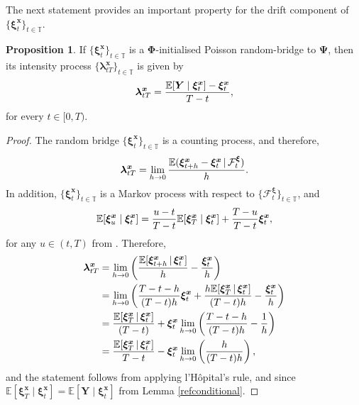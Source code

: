 \documentclass{article}
\def\E{\mathbb{E}}
\def\T{\mathbb{T}}
\def\F{\mathcal{F}}
\def\xib{\boldsymbol{\xi}}
\theoremstyle{definition}
\newtheorem{proposition}{Proposition}[section]
\begin{document}
The next statement provides an important property for the drift component of $\{\boldsymbol{\xi}^{\boldsymbol{x}}_t\}_{t \in \mathbb{T}}$.
\begin{proposition}
\label{poissonrandombridgeintensity}
If $\{\xib^{\boldsymbol{x}}_t\}_{t\in\T}$ is a $\boldsymbol{\Phi}$-initialised Poisson random-bridge to $\boldsymbol{\Psi}$, then its intensity process $\{\boldsymbol{\lambda}^{\boldsymbol{x}}_{tT}\}_{t\in\T}$ is given by
\begin{align}
\boldsymbol{\lambda}^{\boldsymbol{x}}_{tT} = \frac{\mathbb{E}[\boldsymbol{Y} \mid \xib^{\boldsymbol{x}}_t ] - \boldsymbol{\xi}^{\boldsymbol{x}}_t}{T-t}, \notag
\end{align}
for every $t\in[0,T)$.
\end{proposition}
\begin{proof}
The random bridge $\{\xib^{\boldsymbol{x}}_t\}_{t\in\T}$ is a counting process, and therefore,
\begin{align}
\boldsymbol{\lambda}^{\boldsymbol{x}}_{tT} = \lim_{h\rightarrow 0}\frac{\E(\xib^{\boldsymbol{x}}_{t+h}  - \xib^{\boldsymbol{x}}_{t} \,|\, \F_t^{\xib})}{h}. \notag 
\end{align}
In addition, $\{\xib^{\boldsymbol{x}}_t\}_{t\in\T}$ is a Markov process with respect to $\{\F_t^{\xib}\}_{t\in\T}$, and
\begin{align}
\mathbb{E}[\boldsymbol{\xi}^{\boldsymbol{x}}_u \mid \boldsymbol{\xi}^{\boldsymbol{x}}_t] = \frac{u-t}{T-t}\mathbb{E}[\boldsymbol{\xi}^{\boldsymbol{x}}_T \mid \boldsymbol{\xi}^{\boldsymbol{x}}_t] + \frac{T-u}{T-t} \boldsymbol{\xi}^{\boldsymbol{x}}_t, \notag
\end{align}
for any $u\in(t,T)$ from \cite{hoylehughstonmacrina_2011}. Therefore,
\begin{align*}
\boldsymbol{\lambda}^{\boldsymbol{x}}_{tT} &= \lim_{h\rightarrow 0} \left(\frac{\E[\xib^{\boldsymbol{x}}_{t+h} \,|\, \xib^{\boldsymbol{x}}_t]}{h} -\frac{\xib^{\boldsymbol{x}}_t}{h}\right) \notag \\
&= \lim_{h\rightarrow 0} \left(\frac{T-t-h}{(T-t)h}\xib^{\boldsymbol{x}}_t + \frac{h\E[\xib^{\boldsymbol{x}}_{T} \,|\, \xib^{\boldsymbol{x}}_t]}{(T-t)h} -\frac{\xib^{\boldsymbol{x}}_t}{h}\right) \notag\\
&= \frac{\E[\xib^{\boldsymbol{x}}_{T} \,|\, \xib^{\boldsymbol{x}}_t]}{(T-t)} + \xib^{\boldsymbol{x}}_t\lim_{h\rightarrow 0} \left(\frac{T-t-h}{(T-t)h} -\frac{1}{h}\right)  \notag \\
&= \frac{\E[\xib^{\boldsymbol{x}}_{T} \,|\, \xib^{\boldsymbol{x}}_t]}{T-t} - \xib^{\boldsymbol{x}}_t\lim_{h\rightarrow 0} \left(\frac{h}{(T-t)h}\right),
\end{align*}
and the statement follows from applying l'H\^opital's rule, and since $\mathbb{E}[\boldsymbol{\xi}^{\boldsymbol{x}}_T \mid \boldsymbol{\xi}^{\boldsymbol{x}}_t] = \mathbb{E}[\boldsymbol{Y} \mid \boldsymbol{\xi}^{\boldsymbol{x}}_t]$ from Lemma \ref{refconditional}.
\end{proof}
\end{document}
